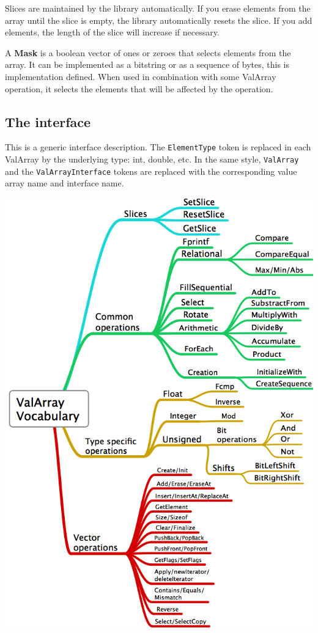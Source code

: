 \documentclass[12pt,a4paper]{memoir} %
\begin{document}
{{Slices are maintained by the library automatically. If you erase elements from the array until the slice is empty, the library automatically
resets the slice. If you add elements, the length of the slice will increase if necessary.

A \textbf{Mask} is a boolean vector of ones or zeroes that selects elements from the array. It can be implemented as a bitstring or as a sequence
of bytes, this is implementation defined. When used in combination with some ValArray operation, it selects the elements that will be affected
by the operation.
\subsection{The interface}
This is a generic interface description. The \texttt{ElementType} token is replaced in each ValArray by the underlying type: 
int, double, etc. In the same
style, \texttt{ValArray} and the \texttt{ValArrayInterface} tokens are replaced with the corresponding value array name and interface name.

\pagestyle{empty}
\newpage
\hspace*{-1.0in}
\includegraphics[scale=0.69]{ValArray.png}
}}
\end{document}
